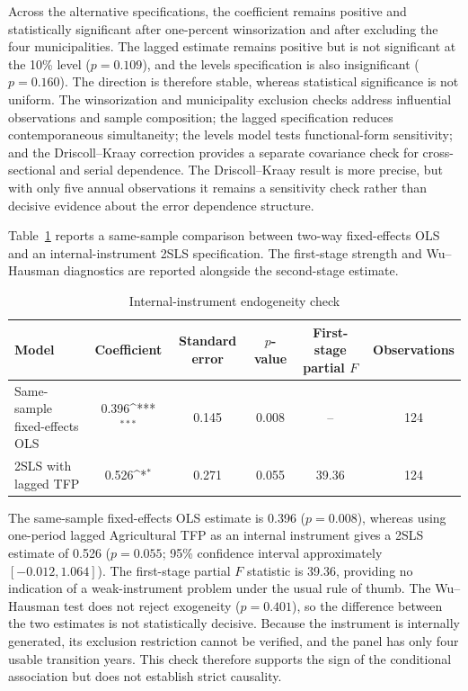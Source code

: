 \documentclass[sustainability,article,submit,moreauthors]{Definitions/mdpi}
\numberwithin{equation}{section}
\newcommand{\sym}[1]{\ifmmode^{#1}\else\(^{#1}\)\fi}
\begin{document}
Across the alternative specifications, the coefficient remains positive and
statistically significant after one-percent winsorization and after excluding
the four municipalities. The lagged estimate remains positive but is not
significant at the 10\% level ($p=0.109$), and the levels specification is also
insignificant ($p=0.160$). The direction is therefore stable, whereas
statistical significance is not uniform. The winsorization and municipality
exclusion checks address influential observations and sample composition; the
lagged specification reduces contemporaneous simultaneity; the levels model
tests functional-form sensitivity; and the Driscoll--Kraay correction provides
a separate covariance check for cross-sectional and serial dependence. The
Driscoll--Kraay result is more precise, but with only five annual observations
it remains a sensitivity check rather than decisive evidence about the error
dependence structure.

Table~\ref{tab:iv} reports a same-sample comparison between two-way
fixed-effects OLS and an internal-instrument 2SLS specification. The
first-stage strength and Wu--Hausman diagnostics are reported alongside the
second-stage estimate.

\begin{table}[H]
\centering
\caption{Internal-instrument endogeneity check}
\label{tab:iv}
\footnotesize
\begin{tabularx}{\textwidth}{Xccccc}
\toprule
Model & Coefficient & Standard error & $p$-value & \shortstack{First-stage\\partial $F$} & Observations \\
\midrule
Same-sample fixed-effects OLS & 0.396\sym{***} & 0.145 & 0.008 & -- & 124 \\
2SLS with lagged TFP & 0.526\sym{*} & 0.271 & 0.055 & 39.36 & 124 \\
\bottomrule
\end{tabularx}
\end{table}

The same-sample fixed-effects OLS estimate is 0.396 ($p=0.008$), whereas
using one-period lagged Agricultural TFP as an internal instrument gives a
2SLS estimate of 0.526 ($p=0.055$; 95\% confidence interval approximately
$[-0.012,1.064]$). The first-stage partial $F$ statistic is 39.36, providing
no indication of a weak-instrument problem under the usual rule of thumb.
The Wu--Hausman test does not reject exogeneity ($p=0.401$), so the difference
between the two estimates is not statistically decisive. Because the
instrument is internally generated, its exclusion restriction cannot be
verified, and the panel has only four usable transition years. This check
therefore supports the sign of the conditional association but does not
establish strict causality.
\end{document}

